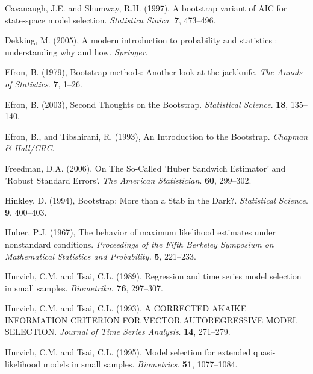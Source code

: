 \rff Cavanaugh, J.E. and Shumway, R.H. (1997),
      A bootstrap variant of AIC for state-space model selection.
      {\it Statistica Sinica}.
      {\bf 7}, {473--496}.

\phantom{a}

\rff Dekking, M. (2005),
      A modern introduction to probability and statistics : understanding why and how.
      {\it Springer}.

\phantom{a}

\rff Efron, B. (1979),
      Bootstrap methods: Another look at the jackknife.
      {\it The Annals of Statistics}.
      {\bf 7}, {1--26}.

\phantom{a}

\rff Efron, B. (2003),
      Second Thoughts on the Bootstrap.
      {\it Statistical Science}.
      {\bf 18}, {135--140}.

\phantom{a}

\rff Efron, B., and Tibshirani, R. (1993),
      An Introduction to the Bootstrap.
      {\it Chapman \& Hall/CRC}.

\phantom{a}

\rff Freedman, D.A. (2006),
      On The So-Called 'Huber Sandwich Estimator' and 'Robust Standard Errors'.
      {\it The American Statistician}.
      {\bf 60}, {299--302}.

\phantom{a}

\rff Hinkley, D. (1994),
      Bootstrap: More than a Stab in the Dark?.
      {\it Statistical Science}.
      {\bf 9}, {400--403}.

\phantom{a}

\rff Huber, P.J. (1967),
    The behavior of maximum likelihood estimates under nonstandard conditions.
    {\it Proceedings of the Fifth Berkeley Symposium on Mathematical Statistics and Probability.}
    {\bf 5}, {221--233}.

\phantom{a}

\rff Hurvich, C.M. and Tsai, C.L. (1989),
      Regression and time series model selection in small samples.
      {\it Biometrika}.
      {\bf 76}, {297--307}.

\phantom{a}

\rff Hurvich, C.M. and Tsai, C.L. (1993),
      A CORRECTED AKAIKE INFORMATION CRITERION FOR VECTOR AUTOREGRESSIVE MODEL SELECTION.
      {\it Journal of Time Series Analysis}.
      {\bf 14}, {271--279}.

\phantom{a}

\rff Hurvich, C.M. and Tsai, C.L. (1995),
      Model selection for extended quasi-likelihood models in small samples.
      {\it Biometrics}.
      {\bf 51}, {1077--1084}.

